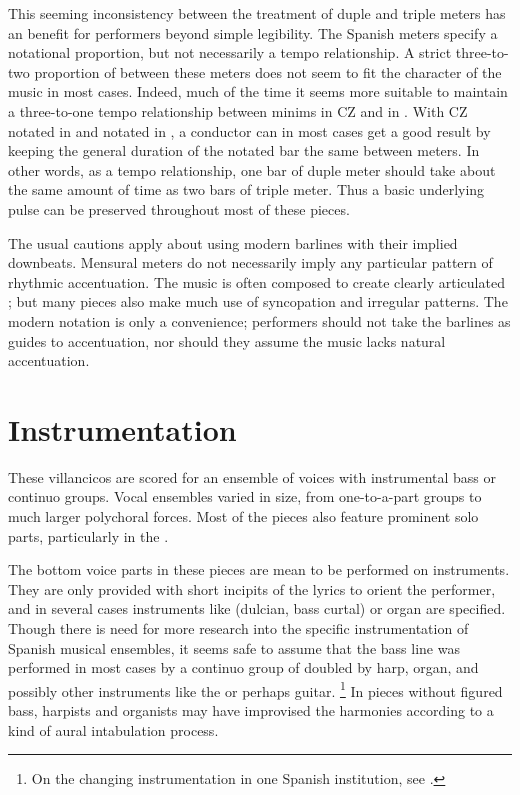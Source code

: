 This seeming inconsistency between the treatment of duple and triple meters has an benefit for performers beyond simple legibility.
The Spanish meters specify a notational proportion, but not necessarily a tempo relationship.
A strict three-to-two proportion of  between these meters does not seem to fit the character of the music in most cases.
Indeed, much of the time it seems more suitable to maintain a three-to-one tempo relationship between minims in CZ and in \meterC.
With CZ notated in  and \meterC{} notated in , a conductor can in most cases get a good result by keeping the general duration of the notated bar the same between meters.
In other words, as a tempo relationship, one bar of duple meter should take about the same amount of time as two bars of triple meter.
Thus a basic underlying pulse can be preserved throughout most of these pieces.

The usual cautions apply about using modern barlines with their implied downbeats.
Mensural meters do not necessarily imply any particular pattern of rhythmic accentuation.
The music is often composed to create clearly articulated ; but many pieces also make much use of syncopation and irregular patterns.
The modern notation is only a convenience; performers should not take the barlines as guides to accentuation, nor should they assume the music lacks natural accentuation.


\section{Instrumentation}

These villancicos are scored for an ensemble of voices with instrumental bass or continuo groups.
Vocal ensembles varied in size, from one-to-a-part groups to much larger polychoral forces.
Most of the pieces also feature prominent solo parts, particularly in the .

The bottom voice parts in these pieces are mean to be performed on instruments. 
They are only provided with short incipits of the lyrics to orient the performer, and in several cases instruments like  (dulcian, bass curtal) or organ are specified.
Though there is need for more research into the specific instrumentation of Spanish musical ensembles, it seems safe to assume that the bass line was performed in most cases by a continuo group of  doubled by harp, organ, and possibly other instruments like the  or perhaps guitar.%
  \footnote{On the changing instrumentation in one Spanish institution, see \autocite{Torrente:PhD}.}
In pieces without figured bass, harpists and organists may have improvised the harmonies according to a kind of aural intabulation process.

